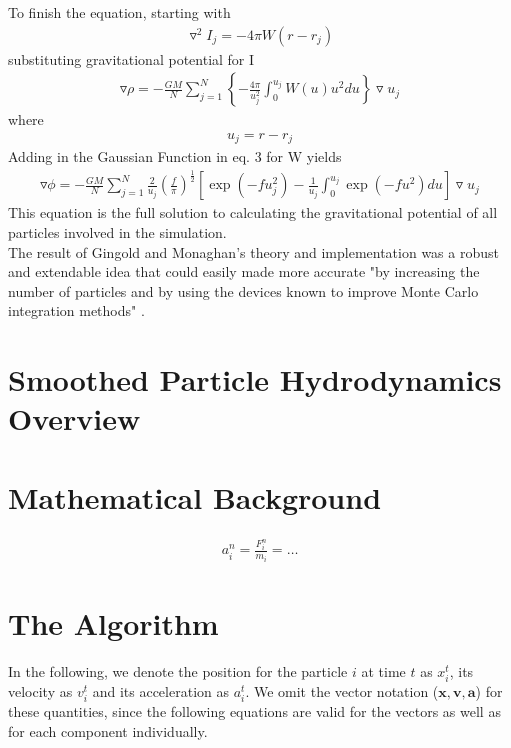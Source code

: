 \documentclass{sigchi}
\begin{document}
To finish the equation, starting with
\begin{align}
\triangledown^2I_j = -4 \pi W(r - r_j)
\end{align}
substituting gravitational potential for I
\begin{align}
\triangledown \rho = - \frac{GM}{N} \sum_{j=1}^N \left \lbrace - \frac{4 \pi}{u_j^2} \int_{0}^{u_j} 
W(u) u^2 du \right \rbrace \triangledown u_j
\end{align}
where
\begin{align}
u_j = r - r_j
\end{align}
Adding in the Gaussian Function in eq. 3 for W yields
\begin{align}
\triangledown \phi = - \frac{GM}{N} \sum_{j=1}^N \frac{2}{u_j} \left ( \frac{f}{\pi} \right )^\frac{1}{2} 
\left \lbrack \exp{(-f u_j^2)} - \frac{1}{u_j} \int_{0}^{u_j} \exp{(-f u^2)} du \right \rbrack 
\triangledown u_j
\end{align}
This equation is the full solution to calculating the gravitational potential of all particles
involved in the simulation.
\\
\hspace*{6 pt} The result of Gingold and Monaghan's theory and implementation was a robust 
and extendable idea that could easily made more accurate "by increasing the number of particles 
and by using the devices known to improve Monte Carlo integration methods" \cite{sphastrophysics}.
%

\section{Smoothed Particle Hydrodynamics Overview}
%

%

\section{Mathematical Background}
%
\begin{align}
	a_i^n = \frac{F_i^n}{m_i} = \dots
	\label{math:acceleration}
\end{align}

\section{The Algorithm}
%
In the following, we denote the position for the particle $i$ at time $t$ as $x_i^t$, its velocity as $v_i^t$ and its acceleration as $a_i^t$.
We omit the vector notation ($\boldsymbol{x},\boldsymbol{v},\boldsymbol{a}$) for these quantities, since the following equations are valid for the vectors as well as for each component individually.
\par\medskip
%
\end{document}
